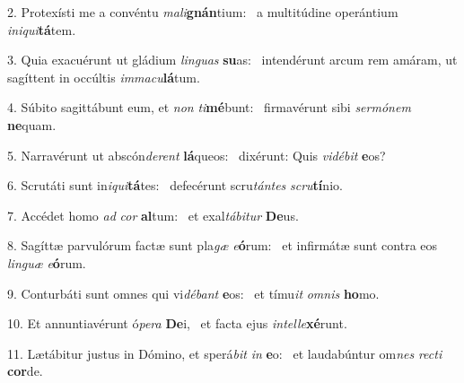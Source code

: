 2. Protexísti me a convéntu \textit{ma}\textit{li}\textbf{gnán}tium: \ast\  a multitúdine operántium \textit{in}\textit{i}\textit{qui}\textbf{tá}tem.\

3. Quia exacuérunt ut gládium \textit{lin}\textit{guas} \textbf{su}as: \ast\  intendérunt arcum rem amáram, ut sagíttent in occúltis \textit{im}\textit{ma}\textit{cu}\textbf{lá}tum.\

4. Súbito sagittábunt eum, et \textit{non} \textit{ti}\textbf{mé}bunt: \ast\  firmavérunt sibi \textit{ser}\textit{mó}\textit{nem} \textbf{ne}quam.\

5. Narravérunt ut abscón\textit{de}\textit{rent} \textbf{lá}queos: \ast\  dixérunt: Quis \textit{vi}\textit{dé}\textit{bit} \textbf{e}os?\

6. Scrutáti sunt in\textit{i}\textit{qui}\textbf{tá}tes: \ast\  defecérunt scru\textit{tán}\textit{tes} \textit{scru}\textbf{tí}nio.\

7. Accédet homo \textit{ad} \textit{cor} \textbf{al}tum: \ast\  et exal\textit{tá}\textit{bi}\textit{tur} \textbf{De}us.\

8. Sagíttæ parvulórum factæ sunt pla\textit{gæ} \textit{e}\textbf{ó}rum: \ast\  et infirmátæ sunt contra eos \textit{lin}\textit{guæ} \textit{e}\textbf{ó}rum.\

9. Conturbáti sunt omnes qui vi\textit{dé}\textit{bant} \textbf{e}os: \ast\  et tímu\textit{it} \textit{om}\textit{nis} \textbf{ho}mo.\

10. Et annuntiavérunt ó\textit{pe}\textit{ra} \textbf{De}i, \ast\  et facta ejus \textit{in}\textit{tel}\textit{le}\textbf{xé}runt.\

11. Lætábitur justus in Dómino, et sperá\textit{bit} \textit{in} \textbf{e}o: \ast\  et laudabúntur om\textit{nes} \textit{rec}\textit{ti} \textbf{cor}de.\

